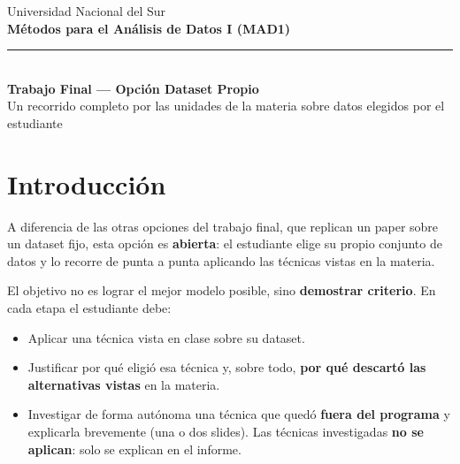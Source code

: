 \documentclass[11pt,a4paper]{article}
\begin{document}
\begin{center}
    {\color{azulUNS}\small Universidad Nacional del Sur}\\[2pt]
    {\color{azulUNS}\Large\bfseries M\'etodos para el An\'alisis de Datos I (MAD1)}\\[6pt]
    {\color{azulUNS}\rule{\textwidth}{1.2pt}}\\[8pt]
    {\Large\bfseries Trabajo Final --- Opci\'on Dataset Propio}\\[4pt]
    {\large Un recorrido completo por las unidades de la materia sobre datos elegidos por el estudiante}
\end{center}

\vspace{1em}

\section{Introducci\'on}
A diferencia de las otras opciones del trabajo final, que replican un paper sobre un dataset fijo, esta opci\'on es \textbf{abierta}: el estudiante elige su propio conjunto de datos y lo recorre de punta a punta aplicando las t\'ecnicas vistas en la materia.

El objetivo no es lograr el mejor modelo posible, sino \textbf{demostrar criterio}. En cada etapa el estudiante debe:
\begin{itemize}[leftmargin=2em,itemsep=2pt]
    \item Aplicar una t\'ecnica vista en clase sobre su dataset.
    \item Justificar por qu\'e eligi\'o esa t\'ecnica y, sobre todo, \textbf{por qu\'e descart\'o las alternativas vistas} en la materia.
    \item Investigar de forma aut\'onoma una t\'ecnica que qued\'o \textbf{fuera del programa} y explicarla brevemente (una o dos slides). Las t\'ecnicas investigadas \textbf{no se aplican}: solo se explican en el informe.
\end{itemize}
\end{document}
